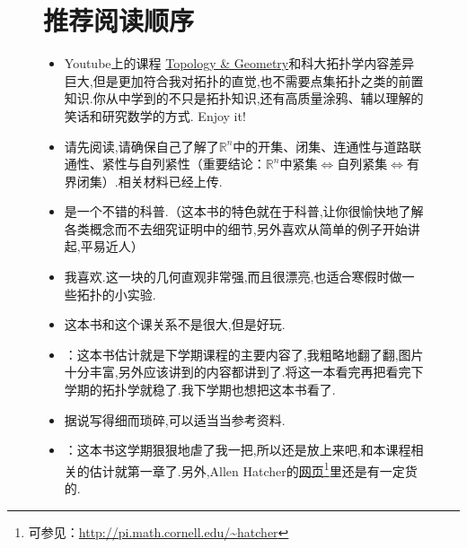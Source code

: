 \documentclass[11pt,A4paper,oneside]{amsart}
\numberwithin{equation}{section}
\theoremstyle{plain}
\theoremstyle{plain}
\numberwithin{equation}{section}
\theoremstyle{remark}
\begin{document}
\begin{figure}[!h]
	\section{推荐阅读顺序}
	\begin{minipage}[b]{.70\textwidth}
		\begin{itemize}
			\item Youtube上的课程 \href{https://www.youtube.com/watch?v=PrOKlcBu4mA\&list=PLTBqohhFNBE_09L0i-lf3fYXF5woAbrzJ}{Topology \& Geometry}和科大拓扑学内容差异巨大,但是更加符合我对拓扑的直觉,也不需要点集拓扑之类的前置知识.你从中学到的不只是拓扑知识,还有高质量涂鸦、辅以理解的笑话和研究数学的方式. Enjoy it!
			\item 请先阅读\cite[Chapter 8]{CS12},请确保自己了解了$\mathbb{R}^n$中的开集、闭集、连通性与道路联通性、紧性与自列紧性（重要结论：$\mathbb{R}^n$中紧集$\Leftrightarrow$自列紧集$\Leftrightarrow$有界闭集）.相关材料已经上传.
			\item \cite[Section 2,4,5 \& Chapter VI]{EC18}是一个不错的科普.（这本书的特色就在于科普,让你很愉快地了解各类概念而不去细究证明中的细节,另外喜欢从简单的例子开始讲起,平易近人）
			\item 我喜欢\cite[p73-79, p82-84, p87-102]{YCY97}.这一块的几何直观非常强,而且很漂亮,也适合寒假时做一些拓扑的小实验.
			\item \cite{ZZM99}这本书和这个课关系不是很大,但是好玩.
			\item \cite{MAA97}：这本书估计就是下学期课程的主要内容了,我粗略地翻了翻,图片十分丰富,另外应该讲到的内容都讲到了.将这一本看完再把\cite[Appendix A]{JM08}看完下学期的拓扑学就稳了.我下学期也想把这本书看了.
			\item 据说\cite{JM00}写得细而琐碎,可以适当当参考资料.
			\item \cite{AH03}：这本书这学期狠狠地虐了我一把,所以还是放上来吧,和本课程相关的估计就第一章了.另外,Allen Hatcher的\href{http://pi.math.cornell.edu/~hatcher/}{网页}\footnote{可参见：\url{http://pi.math.cornell.edu/~hatcher}}里还是有一定货的.
		\end{itemize}
	\end{minipage}
	\begin{minipage}[b]{.27\textwidth}
		\centering

\end{minipage}
\end{figure}
\end{document}
